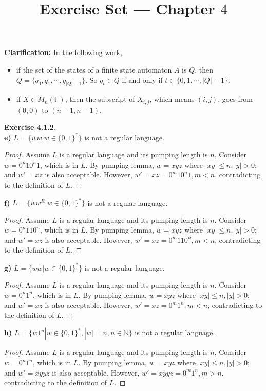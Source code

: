 \documentclass[a4paper]{article}
\title{Exercise Set --- Chapter $4$}
\date{}
\newtheorem*{proof}{Proof}
\newenvironment{exercise}[1]{
	\par
	\noindent\textbf{Exercise #1.}\quad
}{
	\par
	\bigskip
}
\newcommand{\Fset}{\mathbb{F}}
\newcommand{\Nset}{\mathbb{N}}
\begin{document}
\maketitle

\noindent\textbf{Clarification:} In the following work,
\begin{itemize}
\item if the set of the states of a finite state automaton $A$ is $Q$,
then $Q=\{q_0,q_1,\cdots,q_{|Q|-1}\}$. So $q_t\in Q$ if and only if $t\in\{0,1,\cdots,|Q|-1\}$.
\item if $X\in M_n(\Fset)$, then the subscript of $X_{i,j}$, which means $(i,j)$, goes from $(0,0)$ to $(n-1,n-1)$.
\end{itemize}

\begin{exercise}{4.1.2}\hspace{0pt}\\
    \textbf{e)} $L=\{ww|w\in\{0,1\}^*\}$ is not a regular language.
    \begin{proof}
        Assume $L$ is a regular language and its pumping length is $n$. 
        Consider $w=0^n10^n1$, which is in $L$. By pumping lemma,
        $w=xyz$ where $|xy|\leqslant n,|y|>0$; and $w'=xz$ is also acceptable.
        However, $w'=xz=0^m10^n1,m<n$, contradicting to the definition of $L$.
    \end{proof}
    \textbf{f)} $L=\{ww^R|w\in\{0,1\}^*\}$ is not a regular language.
    \begin{proof}
        Assume $L$ is a regular language and its pumping length is $n$. 
        Consider $w=0^n110^n$, which is in $L$. By pumping lemma,
        $w=xyz$ where $|xy|\leqslant n,|y|>0$; and $w'=xz$ is also acceptable.
        However, $w'=xz=0^m110^n,m<n$, contradicting to the definition of $L$.
    \end{proof}
    \textbf{g)} $L=\{w\overline{w}|w\in\{0,1\}^*\}$ is not a regular language.
    \begin{proof}
        Assume $L$ is a regular language and its pumping length is $n$. 
        Consider $w=0^n1^n$, which is in $L$. By pumping lemma,
        $w=xyz$ where $|xy|\leqslant n,|y|>0$; and $w'=xz$ is also acceptable.
        However, $w'=xz=0^m1^n,m<n$, contradicting to the definition of $L$.
    \end{proof}
    \textbf{h)} $L=\{w1^n|w\in\{0,1\}^*,|w|=n,n\in\Nset\}$ is not a regular language.
    \begin{proof}
        Assume $L$ is a regular language and its pumping length is $n$. 
        Consider $w=0^n1^n$, which is in $L$. By pumping lemma,
        $w=xyz$ where $|xy|\leqslant n,|y|>0$; and $w'=xyyz$ is also acceptable.
        However, $w'=xyyz=0^m1^n,m>n$, contradicting to the definition of $L$.
    \end{proof}
\end{exercise}
\end{document}

